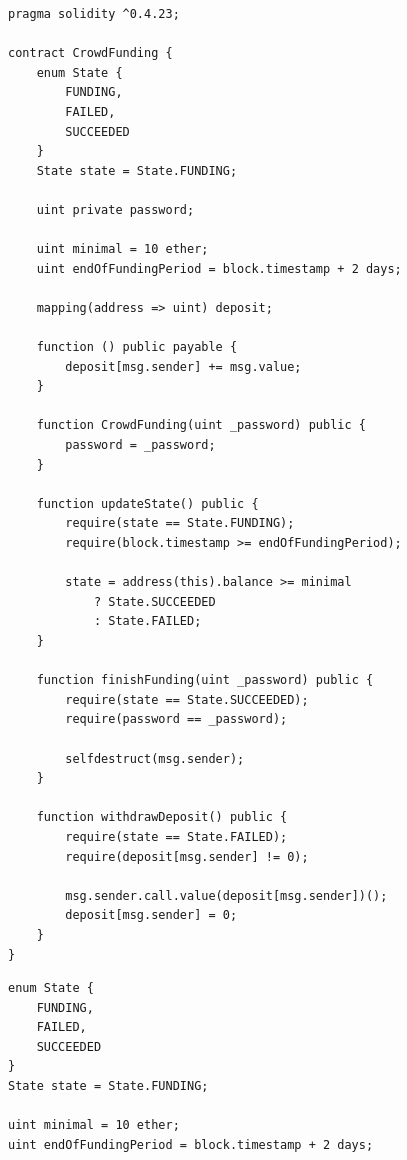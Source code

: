 \documentclass[xcolor=x11names,compress]{beamer}
\begin{document}
\bgroup
\begin{frame}[fragile]
	\vspace{1cm}
	\begin{overprint}
		\begin{minipage}[c][0.7\textheight][c]{\textwidth}
			\begin{verbatim}
pragma solidity ^0.4.23;

contract CrowdFunding {
    enum State {
        FUNDING,
        FAILED,
        SUCCEEDED
    }
    State state = State.FUNDING;

    uint private password;

    uint minimal = 10 ether;
    uint endOfFundingPeriod = block.timestamp + 2 days;

    mapping(address => uint) deposit;
    
    function () public payable {
        deposit[msg.sender] += msg.value;
    }

    function CrowdFunding(uint _password) public {
        password = _password;
    }
    
    function updateState() public {
        require(state == State.FUNDING);
        require(block.timestamp >= endOfFundingPeriod);
        
        state = address(this).balance >= minimal
            ? State.SUCCEEDED
            : State.FAILED;
    }
    
    function finishFunding(uint _password) public {
        require(state == State.SUCCEEDED);
        require(password == _password);
        
        selfdestruct(msg.sender);
    }
    
    function withdrawDeposit() public {
        require(state == State.FAILED);
        require(deposit[msg.sender] != 0);
        
        msg.sender.call.value(deposit[msg.sender])();
        deposit[msg.sender] = 0;
    }
}
    \end{verbatim}
		\end{minipage}
		\begin{minipage}[c][0.7\textheight][c]{\textwidth}
			\begin{verbatim}
enum State {
    FUNDING,
    FAILED,
    SUCCEEDED
}
State state = State.FUNDING;

uint minimal = 10 ether;
uint endOfFundingPeriod = block.timestamp + 2 days;
    \end{verbatim}
		\end{minipage}


\end{overprint}
\end{frame}
\end{document}
